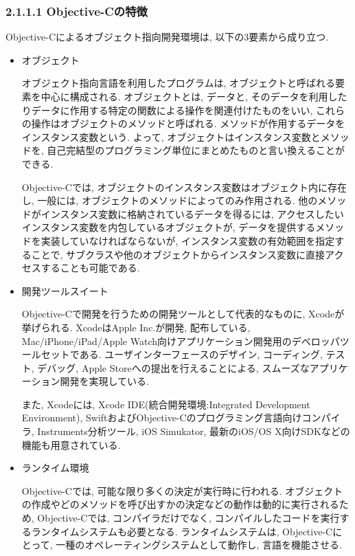 \subsubsection{2.1.1.1 Objective-Cの特徴}
Objective-Cによるオブジェクト指向開発環境は, 以下の3要素から成り立つ.
\begin{itemize}
\item オブジェクト

オブジェクト指向言語を利用したプログラムは, オブジェクトと呼ばれる要素を中心に構成される.
オブジェクトとは, データと, そのデータを利用したりデータに作用する特定の関数による操作を関連付けたものをいい, これらの操作はオブジェクトのメソッドと呼ばれる.
メソッドが作用するデータをインスタンス変数という.
よって, オブジェクトはインスタンス変数とメソッドを, 自己完結型のプログラミング単位にまとめたものと言い換えることができる.

Objective-Cでは, オブジェクトのインスタンス変数はオブジェクト内に存在し, 一般には, オブジェクトのメソッドによってのみ作用される.
他のメソッドがインスタンス変数に格納されているデータを得るには, アクセスしたいインスタンス変数を内包しているオブジェクトが, データを提供するメソッドを実装していなければならないが, インスタンス変数の有効範囲を指定することで, サブクラスや他のオブジェクトからインスタンス変数に直接アクセスすることも可能である.

\item 開発ツールスイート

Objective-Cで開発を行うための開発ツールとして代表的なものに, Xcodeが挙げられる.
XcodeはApple Inc.が開発, 配布している, Mac/iPhone/iPad/Apple Watch向けアプリケーション開発用のデベロッパツールセットである.
ユーザインターフェースのデザイン, コーディング, テスト, デバッグ, Apple Storeへの提出を行えることによる, スムーズなアプリケーション開発を実現している.

また, Xcodeには, Xcode IDE(統合開発環境:Integrated Development Environment), SwiftおよびObjective-Cのプログラミング言語向けコンパイラ, Instruments分析ツール, iOS Simukator, 最新のiOS/OS X向けSDKなどの機能も用意されている.

\item ランタイム環境

Objective-Cでは, 可能な限り多くの決定が実行時に行われる.
オブジェクトの作成やどのメソッドを呼び出すかの決定などの動作は動的に実行されるため, Objective-Cでは, コンパイラだけでなく, コンパイルしたコードを実行するランタイムシステムも必要となる.
ランタイムシステムは, Objective-Cにとって, 一種のオペレーティングシステムとして動作し, 言語を機能させる.
\end{itemize}

